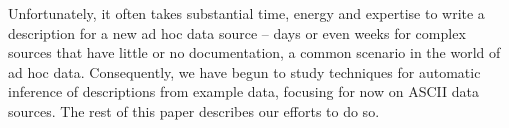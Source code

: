 \documentclass{sig-alternate-sigmod08}
\begin{document}
Unfortunately, it often takes substantial time, energy and expertise
to write a \pads{} description for a new ad hoc data source
-- days or even weeks for complex sources that have little or
no documentation, a common scenario in the world of ad hoc data.
Consequently, we have begun to study techniques for automatic
inference of \pads{} descriptions from example data, focusing for now
on ASCII data sources.   The rest of this 
paper describes our efforts to do so.




\end{document}
